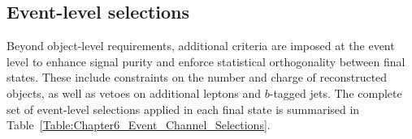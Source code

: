 {\begin{table}[h]
\begin{minipage}{0.95\linewidth}
\end{minipage}

\end{table}
}

\subsection{Event-level selections}
Beyond object-level requirements, additional criteria are imposed at the event level to enhance signal purity and enforce statistical orthogonality between final states. These include constraints on the number and charge of reconstructed objects, as well as vetoes on additional leptons and $b$-tagged jets. The complete set of event-level selections applied in each final state is summarised in Table~\ref{Table:Chapter6_Event_Channel_Selections}.

